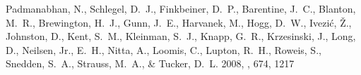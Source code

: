 \documentclass[manuscript]{aastex}
\begin{document}


\begin{thebibliography}{}
 {Padmanabhan, N., Schlegel, D.~J., Finkbeiner, D.~P., Barentine, J.~C., Blanton, M.~R., Brewington, H.~J., Gunn, J.~E., Harvanek, M., Hogg, D.~W., Ivezi{\'c}, {\v Z}., Johnston, D., Kent, S.~M., Kleinman, S.~J., Knapp, G.~R., Krzesinski, J., Long, D., Neilsen, Jr., E.~H., Nitta, A., Loomis, C., Lupton, R.~H., Roweis, S., Snedden, S.~A., Strauss, M.~A., \& Tucker, D.~L. 2008, \apj, 674, 1217}
\end{thebibliography}
\clearpage





\end{document}
